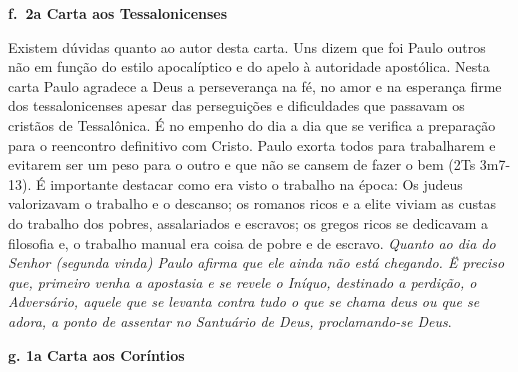 \documentclass[
]{book}
\begin{document}
\textbf{f.~2a Carta aos Tessalonicenses}

Existem dúvidas quanto ao autor desta carta. Uns dizem que foi Paulo outros não em função do estilo apocalíptico e do apelo à autoridade apostólica. Nesta carta Paulo agradece a Deus a perseverança na fé, no amor e na esperança firme dos tessalonicenses apesar das perseguições e dificuldades que passavam os cristãos de Tessalônica. É no empenho do dia a dia que se verifica a preparação para o reencontro definitivo com Cristo. Paulo exorta todos para trabalharem e evitarem ser um peso para o outro e que não se cansem de fazer o bem (2Ts 3m7-13). É importante destacar como era visto o trabalho na época: Os judeus valorizavam o trabalho e o descanso; os romanos ricos e a elite viviam as custas do trabalho dos pobres, assalariados e escravos; os gregos ricos se dedicavam a filosofia e, o trabalho manual era coisa de pobre e de escravo. \emph{Quanto ao dia do Senhor (segunda vinda) Paulo afirma que ele ainda não está chegando. Ë preciso que, primeiro venha a apostasia e se revele o Iníquo, destinado a perdição, o Adversário, aquele que se levanta contra tudo o que se chama deus ou que se adora, a ponto de assentar no Santuário de Deus, proclamando-se Deus}.

\textbf{g. 1a Carta aos Coríntios}
\end{document}
